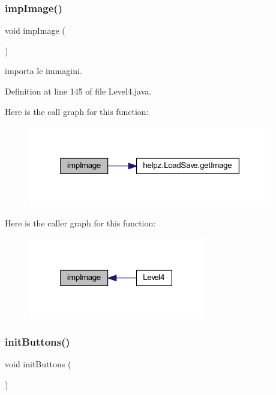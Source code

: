 \subsubsection{\texorpdfstring{imp\+Image()}{impImage()}}
{\footnotesize\ttfamily void imp\+Image (\begin{DoxyParamCaption}{ }\end{DoxyParamCaption})\hspace{0.3cm}{\ttfamily [private]}}



importa le immagini. 



Definition at line 145 of file Level4.\+java.

Here is the call graph for this function\+:\nopagebreak
\begin{figure}[H]
\begin{center}
\leavevmode
\includegraphics[width=303pt]{classscenes_1_1_level4_aded9c531b53772fd90d09a8b6bf0132e_cgraph}
\end{center}
\end{figure}
Here is the caller graph for this function\+:\nopagebreak
\begin{figure}[H]
\begin{center}
\leavevmode
\includegraphics[width=219pt]{classscenes_1_1_level4_aded9c531b53772fd90d09a8b6bf0132e_icgraph}
\end{center}
\end{figure}
\mbox{\label{classscenes_1_1_level4_a27d3ba5afb772cc36c9a432c28975ace}} 
\subsubsection{\texorpdfstring{init\+Buttons()}{initButtons()}}
{\footnotesize\ttfamily void init\+Buttons (\begin{DoxyParamCaption}{ }\end{DoxyParamCaption})\hspace{0.3cm}{\ttfamily [private]}}



